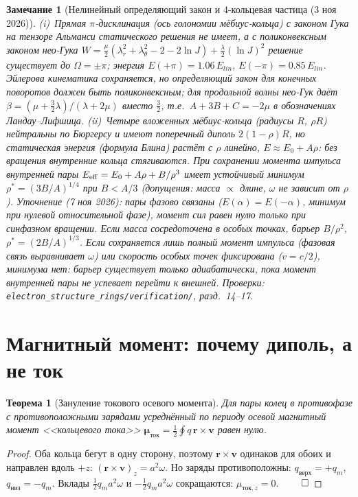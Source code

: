 \documentclass[12pt,a4paper]{article}
\newtheorem{theorem}{Теорема}
\newtheorem{remark}{Замечание}
\begin{document}
\begin{remark}[Нелинейный определяющий закон и 4-кольцевая частица (3 ноя 2026)]
(i)~Прямая $\pi$-дисклинация (ось голономии мёбиус-кольца) с законом Гука на тензоре Альманси
статического решения не имеет, а с поликонвексным законом нео-Гука
$W=\tfrac\mu2(\lambda_r^2+\lambda_\theta^2-2-2\ln J)+\tfrac\lambda2(\ln J)^2$ решение существует
до $\Omega=\pm\pi$; энергия $E(+\pi)=1.06\,E_{lin}$, $E(-\pi)=0.85\,E_{lin}$. Эйлерова кинематика
сохраняется, но определяющий закон для конечных поворотов должен быть поликонвексным; для
продольной волны нео-Гук даёт $\beta=(\mu+\tfrac32\lambda)/(\lambda+2\mu)$ вместо $\tfrac32$,
т.е.\ $A+3B+C=-2\mu$ в обозначениях Ландау--Лифшица.
(ii)~Четыре вложенных мёбиус-кольца (радиусы $R$, $\rho R$) нейтральны по Бюргерсу и имеют
поперечный диполь $2(1-\rho)R$, но статическая энергия (формула Блина) растёт с $\rho$ линейно,
$E\approx E_0+A\rho$: без вращения внутренние кольца стягиваются. При сохранении момента импульса
внутренней пары $E_{\rm eff}=E_0+A\rho+B/\rho^3$ имеет устойчивый минимум
$\rho^*=(3B/A)^{1/4}$ при $B<A/3$ (допущения: масса $\propto$ длине, $\omega$ не зависит от $\rho$).
Уточнение (7 ноя 2026): пары фазово связаны ($E(\alpha)=E(-\alpha)$, минимум при нулевой относительной
фазе), момент сил равен нулю только при синфазном вращении. Если масса сосредоточена в особых точках,
барьер $B/\rho^2$, $\rho^*=(2B/A)^{1/3}$. Если сохраняется лишь \emph{полный} момент импульса
(фазовая связь выравнивает $\omega$) или скорость особых точек фиксирована ($v=c/2$), минимума нет:
барьер существует только адиабатически, пока момент внутренней пары не успевает перейти к внешней.
Проверки: \texttt{electron\_structure\_rings/verification/}, разд.~14--17.
\end{remark}

\section{Магнитный момент: почему диполь, а не ток}

\begin{theorem}[Зануление токового осевого момента]
\label{th:mu0}
Для пары колец в противофазе с противоположными зарядами усреднённый по периоду
осевой магнитный момент <<кольцевого тока>> $\boldsymbol{\mu}_{\text{ток}}=
\tfrac12\oint q\,\mathbf{r}\times\mathbf{v}$ равен нулю.
\end{theorem}
\begin{proof}
Оба кольца бегут в одну сторону, поэтому $\mathbf{r}\times\mathbf{v}$ одинаков
для обоих и направлен вдоль $+z$: $(\mathbf{r}\times\mathbf{v})_z=a^2\omega$.
Но заряды противоположны: $q_{\text{верх}}=+q_m$, $q_{\text{низ}}=-q_m$. Вклады
$\tfrac12 q_m a^2\omega$ и $-\tfrac12 q_m a^2\omega$ сокращаются:
$\mu_{\text{ток},z}=0$. $\qed$
\end{proof}
\end{document}
